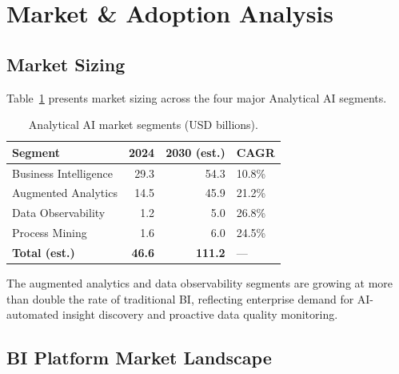 \documentclass[12pt, a4paper]{article}
\begin{document}
\section{Market \& Adoption Analysis}\label{sec:market}

\subsection{Market Sizing}
Table~\ref{tab:market} presents market sizing across the four major Analytical AI segments.

\begin{table}[ht]
\centering
\caption{Analytical AI market segments (USD billions).}
\label{tab:market}
\begin{tabular}{lrrl}
\toprule
\textbf{Segment} & \textbf{2024} & \textbf{2030 (est.)} & \textbf{CAGR} \\
\midrule
Business Intelligence       & 29.3 & 54.3  & 10.8\% \\
Augmented Analytics         & 14.5 & 45.9  & 21.2\% \\
Data Observability          & 1.2  & 5.0   & 26.8\% \\
Process Mining              & 1.6  & 6.0   & 24.5\% \\
\midrule
\textbf{Total (est.)}      & \textbf{46.6} & \textbf{111.2} & --- \\
\bottomrule
\end{tabular}
\end{table}

The augmented analytics and data observability segments are growing at more than double the rate of traditional BI, reflecting enterprise demand for AI-automated insight discovery and proactive data quality monitoring.

\subsection{BI Platform Market Landscape}
\end{document}
